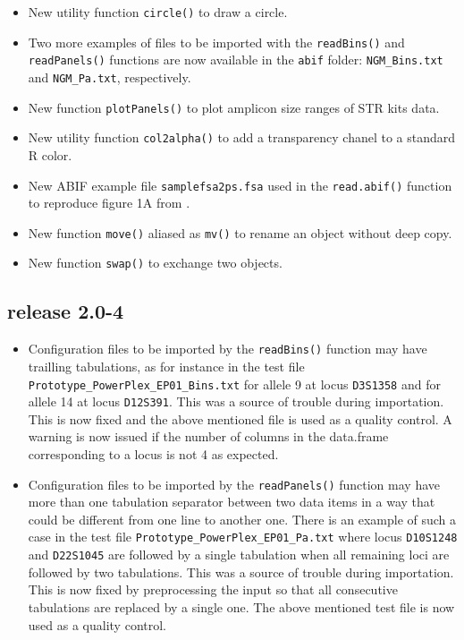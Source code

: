 \documentclass{article}
\begin{document}
\begin{itemize}

\item New utility function \texttt{circle()} to draw a circle.

\item Two more examples of files to be imported with the \texttt{readBins()}
and \texttt{readPanels()} functions are now available in the \texttt{abif}
folder: \texttt{NGM\_Bins.txt} and \texttt{NGM\_Pa.txt}, respectively.

\item New function \texttt{plotPanels()} to plot amplicon size ranges of STR
kits data.

\item New utility function \texttt{col2alpha()} to add a transparency 
chanel to a standard R color.

\item New ABIF example file \texttt{samplefsa2ps.fsa} used in the
\texttt{read.abif()} function to reproduce figure 1A from \cite{Krawczyk2009}.

\item New function \texttt{move()} aliased as \texttt{mv()} to rename
an object without deep copy.

\item New function \texttt{swap()} to exchange two objects.

\end{itemize}

\subsection*{release 2.0-4}

\begin{itemize}

\item Configuration files to be imported by the \texttt{readBins()}
function may have trailling tabulations, as for instance in the
test file \texttt{Prototype\_PowerPlex\_EP01\_Bins.txt} for allele
9 at locus \texttt{D3S1358} and for allele 14 at locus \texttt{D12S391}.
This was a source of trouble during importation. This is now fixed
and the above mentioned file is used as a quality control. A warning
is now issued if the number of columns in the data.frame corresponding
to a locus is not 4 as expected.

\item Configuration files to be imported by the \texttt{readPanels()}
function may have more than one tabulation separator between
two data items in a way that could be different from one
line to another one. There is an example of such a case in the
test file \texttt{Prototype\_PowerPlex\_EP01\_Pa.txt} where
locus \texttt{D10S1248} and \texttt{D22S1045} are followed by a
single tabulation when all remaining loci are followed by two
tabulations.
This was a source of trouble during importation.
This is now fixed by preprocessing the input so that
all consecutive tabulations are replaced by a single one.
The above mentioned test file is now used as a quality control.

\end{itemize}
\end{document}
